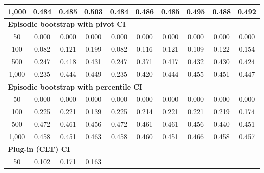 \documentclass{article}
\numberwithin{equation}{section}
\begin{document}
\begin{table}[ht]
\begin{tabular}{c|ccc|cccccc}
1{,}000
& \cellcolor{covheat!92!white}0.484 & \cellcolor{covheat!92!white}0.485 & \cellcolor{covheat!100!white}0.503
& \cellcolor{covheat!92!white}0.484 & \cellcolor{covheat!93!white}0.486 & \cellcolor{covheat!92!white}0.485 & \cellcolor{covheat!98!white}0.495 & \cellcolor{covheat!94!white}0.488 & \cellcolor{covheat!96!white}0.492 \\
\hline
\multicolumn{10}{l}{\textbf{Episodic bootstrap with pivot CI}} \\ \hline
50
& 0.000 & 0.000 & 0.000
& 0.000 & 0.000 & 0.000 & 0.000 & 0.000 & 0.000 \\
100
& 0.082 & 0.121 & 0.199
& 0.082 & 0.116 & 0.121 & 0.109 & 0.122 & 0.154 \\
500
& 0.247 & \cellcolor{covheat!59!white}0.418 & \cellcolor{covheat!66!white}0.431
& 0.247 & \cellcolor{covheat!36!white}0.371 & \cellcolor{covheat!58!white}0.417 & \cellcolor{covheat!66!white}0.432 & \cellcolor{covheat!65!white}0.430 & \cellcolor{covheat!62!white}0.424 \\
1{,}000
& 0.235 & \cellcolor{covheat!72!white}0.444 & \cellcolor{covheat!75!white}0.449
& 0.235 & \cellcolor{covheat!60!white}0.420 & \cellcolor{covheat!72!white}0.444 & \cellcolor{covheat!78!white}0.455 & \cellcolor{covheat!76!white}0.451 & \cellcolor{covheat!74!white}0.447 \\
\hline
\multicolumn{10}{l}{\textbf{Episodic bootstrap with percentile CI}} \\ \hline
50
& 0.000 & 0.000 & 0.000
& 0.000 & 0.000 & 0.000 & 0.000 & 0.000 & 0.000 \\
100
& 0.225 & 0.221 & 0.139
& 0.225 & 0.214 & 0.221 & 0.221 & 0.219 & 0.174 \\
500
& \cellcolor{covheat!86!white}0.472 & \cellcolor{covheat!81!white}0.461 & \cellcolor{covheat!78!white}0.456
& \cellcolor{covheat!86!white}0.472 & \cellcolor{covheat!81!white}0.461 & \cellcolor{covheat!81!white}0.461 & \cellcolor{covheat!78!white}0.456 & \cellcolor{covheat!70!white}0.440 & \cellcolor{covheat!76!white}0.451 \\
1{,}000
& \cellcolor{covheat!79!white}0.458 & \cellcolor{covheat!76!white}0.451 & \cellcolor{covheat!82!white}0.463
& \cellcolor{covheat!79!white}0.458 & \cellcolor{covheat!80!white}0.460 & \cellcolor{covheat!76!white}0.451 & \cellcolor{covheat!83!white}0.466 & \cellcolor{covheat!79!white}0.458 & \cellcolor{covheat!79!white}0.457 \\
\hline
\multicolumn{10}{l}{\textbf{Plug-in (CLT) CI}} \\ \hline
50
& 0.102 & 0.171 & 0.163

\end{tabular}
\end{table}
\end{document}
